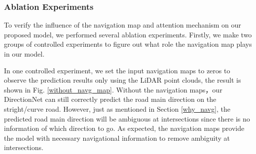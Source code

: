 \documentclass[letterpaper,10 pt,conference]{ieeeconf}  %
\begin{document}
\subsubsection{Ablation Experiments}
To verify the influence of the navigation map and attention mechanism on our proposed model, we performed several ablation experiments. Firstly, we make two groups of controlled experiments to figure out what role the navigation map plays in our model.

In one controlled experiment, we set the input navigation maps to zeros to observe the prediction results only using the LiDAR point clouds, the result is shown in Fig. \ref{without_navg_map}. Without the navigation maps，our DirectionNet can still correctly predict the road main direction on the stright/curve road. However, just as mentioned in Section \ref{why_navg}, the predicted road main direction will be ambiguous at intersections since there is no information of which direction to go. As expected, the navigation maps provide the model with necessary navigational information to remove ambiguity at intersections.
\end{document}
